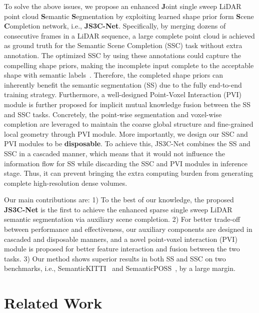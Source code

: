 \documentclass[letterpaper]{article} \usepackage{aaai21}  \usepackage{times}  \usepackage{helvet} \usepackage{courier}  \usepackage[hyphens]{url}  \usepackage{graphicx} \urlstyle{rm} \def\UrlFont{\rm}  \usepackage{natbib}  \usepackage{booktabs}
\begin{document}
	
	To solve the above issues, we propose an enhanced \textbf{J}oint single sweep LiDAR point cloud \textbf{S}emantic \textbf{S}egmentation by exploiting learned shape prior form \textbf{S}cene \textbf{C}ompletion network, i.e., \textbf{JS3C-Net}.
Specifically, by merging dozens of consecutive frames in a LiDAR sequence, a large complete point cloud is achieved as ground truth for the Semantic Scene Completion (SSC) task without extra annotation.
The optimized SSC by using these annotations could capture the compelling shape priors, making the incomplete input complete to the acceptable shape with semantic labels~\cite{Song2017Semantic}.
Therefore, the completed shape priors can inherently benefit the semantic segmentation (SS) due to the fully end-to-end training strategy. 
Furthermore, a well-designed Point-Voxel Interaction (PVI) module is further proposed for implicit mutual knowledge fusion between the SS and SSC tasks.
Concretely, the point-wise segmentation and voxel-wise completion are leveraged to maintain the coarse global structure and fine-grained local geometry through PVI module.
More importantly, we design our SSC and PVI modules to be \textbf{disposable}.
To achieve this, JS3C-Net combines the SS and SSC in a cascaded manner, which means that it would not influence the information flow for SS while discarding the SSC and PVI modules in inference stage. 
Thus, it can prevent bringing the extra computing burden from generating complete high-resolution dense volumes.


	
	Our main contributions are: 
1) To the best of our knowledge, the proposed \textbf{JS3C-Net} is the first to achieve the enhanced sparse single sweep LiDAR semantic segmentation via auxiliary scene completion.
2) For better trade-off between performance and effectiveness, our auxiliary components are designed in cascaded and disposable manners, and a novel point-voxel interaction (PVI) module is proposed for better feature interaction and fusion between the two tasks. 
3) Our method shows superior results in both SS and SSC on two benchmarks, i.e., SemanticKITTI~\cite{behley2019semantickitti} and SemanticPOSS~\cite{pan2020semanticposs}, by a large margin.
	
	\section{Related Work}
\end{document}
